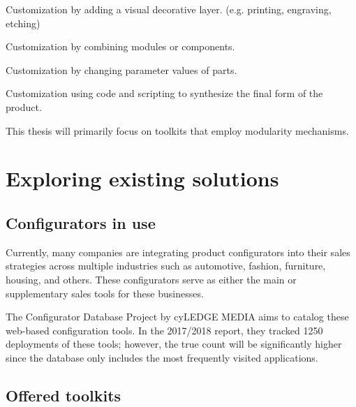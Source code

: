\begin{definition}[Veneer]
Customization by adding a visual decorative layer. (e.g. printing, engraving, etching)
\end{definition}

\begin{definition}[Modularity]
Customization by combining modules or components.
\end{definition}

\begin{definition}[Parametric]
Customization by changing parameter values of parts.
\end{definition}

\begin{definition}[Generative]
Customization using code and scripting to synthesize the final form of the product.
\end{definition}

This thesis will primarily focus on toolkits that employ modularity mechanisms.





\section{Exploring existing solutions}
\subsection{Configurators in use}

Currently, many companies are integrating product configurators into their sales strategies across multiple industries such as automotive, fashion, furniture, housing, and others. These configurators serve as either the main or supplementary sales tools for these businesses.

The Configurator Database Project by cyLEDGE MEDIA aims to catalog these web-based configuration tools. In the 2017/2018 report, they tracked 1250 deployments of these tools; however, the true count will be significantly higher since the database only includes the most frequently visited applications. \cite{cyLEDGE2018}

\subsection{Offered toolkits}